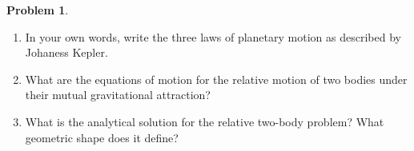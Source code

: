\documentclass[10pt]{article}
\theoremstyle{definition}
\newtheorem{prob}{Problem}[section]
\newenvironment{subprob}%
{\renewcommand{\theenumi}{\alph{enumi}}\renewcommand{\labelenumi}{(\theenumi)}\begin{enumerate}}%
{\end{enumerate}}%
\begin{document}
\begin{prob}
\begin{subprob}
    \vspace*{1cm}
     
    \item In your own words, write the three laws of planetary motion as described by Johaness Kepler.

    \vspace*{3cm}

    \item What are the equations of motion for the relative motion of two bodies under their mutual gravitational attraction?

    \vspace*{1cm}

    \item What is the analytical solution for the relative two-body problem? What geometric shape does it define?

\end{subprob}
\end{prob}
\end{document}
